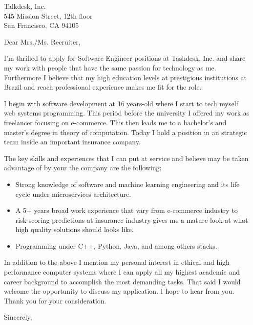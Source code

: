 \documentclass{scrlttr2}
\begin{document}
\renewcommand{\enclname}{Enclosures}

\begin{letter}{%
    Talkdesk, Inc.\\
    545 Mission Street, 12th floor\\
    San Francisco, CA 94105%
  }

  \opening{Dear Mrs./Ms. Recruiter,}

  I'm thrilled to apply for Software Engineer positions at Taskdesk, Inc. and
  share my work with people that have the same passion for technology as
  me. Furthermore I believe that my high education levels at prestigious
  institutions at Brazil and reach professional experience makes me fit for the
  role.

  I begin with software development at 16 years-old where I start to tech myself
  web systems programming. This period before the university I offered my work
  as freelancer focusing on e-commerce. This then leads me to a bachelor's and
  master's degree in theory of computation. Today I hold a position in an
  strategic team inside an important insurance company.

  The key skills and experiences that I can put at service and believe may be
  taken advantage of by your the company are the following:

  \begin{itemize}
  \item Strong knowledge of software and machine learning engineering and its
    life cycle under microservices architecture.
  \item A 5+ years broad work experience that vary from e-commerce industry to
    risk scoring predictions at insurance industry gives me a mature look at
    what high quality solutions should looks like.
  \item Programming under C++, Python, Java, and among others stacks.
  \end{itemize}

  In addition to the above I mention my personal interest in ethical and high
  performance computer systems where I can apply all my highest academic and
  career background to accomplish the most demanding tasks. That said I would
  welcome the opportunity to discuss my application. I hope to hear from
  you. Thank you for your consideration.

  \closing{Sincerely,}


\end{letter}
\end{document}
